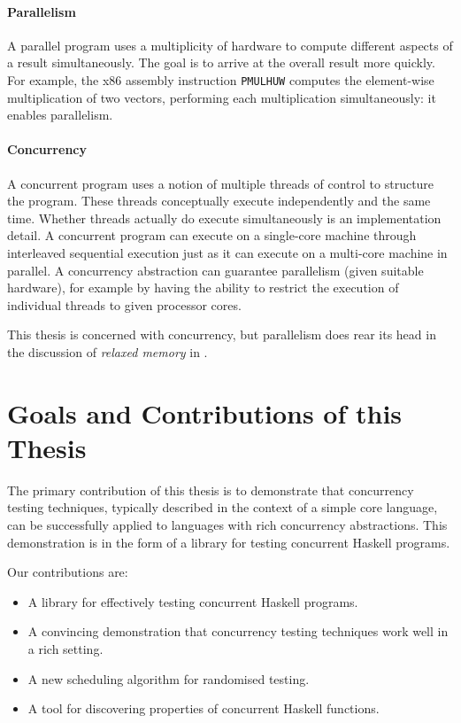 \paragraph{Parallelism}
A parallel program uses a multiplicity of hardware to compute
different aspects of a result simultaneously.  The goal is to arrive
at the overall result more quickly.  For example, the x86 assembly
instruction \verb#PMULHUW# computes the element-wise multiplication of
two vectors, performing each multiplication simultaneously: it enables
parallelism.

\paragraph{Concurrency}
A concurrent program uses a notion of multiple threads of control to
structure the program.  These threads conceptually execute
independently and the same time.  Whether threads actually do execute
simultaneously is an implementation detail.  A concurrent program can
execute on a single-core machine through interleaved sequential
execution just as it can execute on a multi-core machine in parallel.
A concurrency abstraction can guarantee parallelism (given suitable
hardware), for example by having the ability to restrict the execution
of individual threads to given processor cores.

This thesis is concerned with concurrency, but parallelism does rear
its head in the discussion of \emph{relaxed memory} in
.

\section{Goals and Contributions of this Thesis}
\label{sec:intro-contributions}

The primary contribution of this thesis is to demonstrate that
concurrency testing techniques, typically described in the context of
a simple core language, can be successfully applied to languages with
rich concurrency abstractions.  This demonstration is in the form of a
library for testing concurrent Haskell programs.

Our contributions are:

\begin{itemize}
\item A library for effectively testing concurrent Haskell programs.
\item A convincing demonstration that concurrency testing techniques
  work well in a rich setting.
\item A new scheduling algorithm for randomised testing.
\item A tool for discovering properties of concurrent Haskell
  functions.
\end{itemize}

